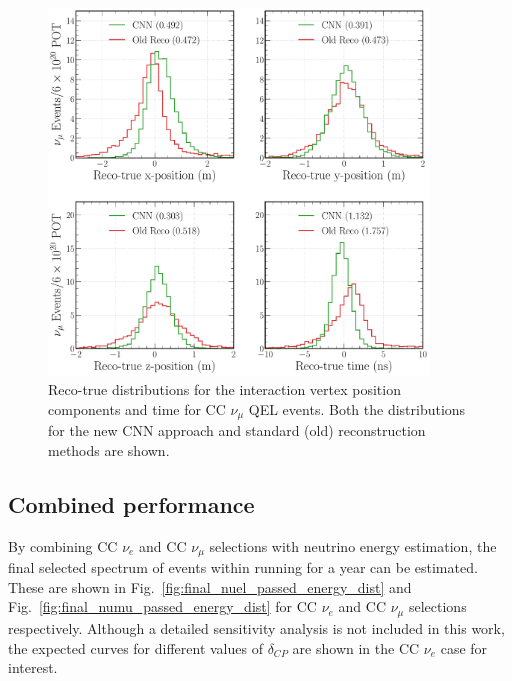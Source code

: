 \begin{figure} %
    \includegraphics[width=0.9\textwidth]{diagrams/7-results/final_vertex_numu_res_comparison.pdf}
    \caption[Reco-true distributions for the interaction vertex parameters for CC $\nu_{\mu}$ QEL
        events] {Reco-true distributions for the interaction vertex position components and time
        for CC $\nu_{\mu}$ QEL events. Both the distributions for the new CNN approach and
        standard (old) reconstruction methods are shown.}
    \label{fig:final_vertex_numu_res_comparison}
\end{figure}

\subsection{Combined performance} %
\label{sec:results_eval_combined} %

By combining CC $\nu_{e}$ and CC $\nu_{\mu}$ selections with neutrino energy estimation, the final
selected spectrum of events within \chipsfive running for a year can be estimated. These are shown
in Fig.~\ref{fig:final_nuel_passed_energy_dist} and Fig.~\ref{fig:final_numu_passed_energy_dist}
for CC $\nu_{e}$ and CC $\nu_{\mu}$ selections respectively. Although a detailed \chipsfive
sensitivity analysis is not included in this work, the expected curves for different values of
$\delta_{CP}$ are shown in the CC $\nu_{e}$ case for interest.

